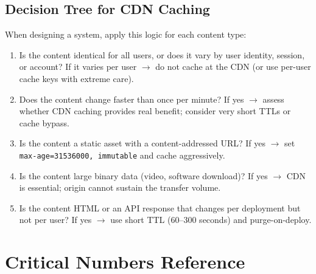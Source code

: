 \documentclass[11pt,a4paper]{article}
\begin{document}
\subsection{Decision Tree for CDN Caching}

When designing a system, apply this logic for each content type:

\begin{enumerate}[leftmargin=2em, itemsep=4pt]
  \item Is the content identical for all users, or does it vary by user identity, session, or account? If it varies per user $\to$ do not cache at the CDN (or use per-user cache keys with extreme care).
  \item Does the content change faster than once per minute? If yes $\to$ assess whether CDN caching provides real benefit; consider very short TTLs or cache bypass.
  \item Is the content a static asset with a content-addressed URL? If yes $\to$ set \texttt{max-age=31536000, immutable} and cache aggressively.
  \item Is the content large binary data (video, software download)? If yes $\to$ CDN is essential; origin cannot sustain the transfer volume.
  \item Is the content HTML or an API response that changes per deployment but not per user? If yes $\to$ use short TTL (60--300 seconds) and purge-on-deploy.
\end{enumerate}

\section{Critical Numbers Reference}
\end{document}
